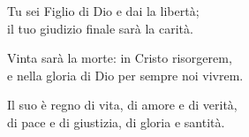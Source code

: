 

\spazio

\strofa Tu sei Figlio di Dio e dai la libertà;\\
il tuo giudizio finale sarà la carità.

\spazio


\spazio

\strofa Vinta sarà la morte: in Cristo risorgerem,\\
e nella gloria di Dio per sempre noi vivrem.

\spazio


\spazio

\strofa Il suo è regno di vita, di amore e di verità,\\
di pace e di giustizia, di gloria e santità.

\spazio


